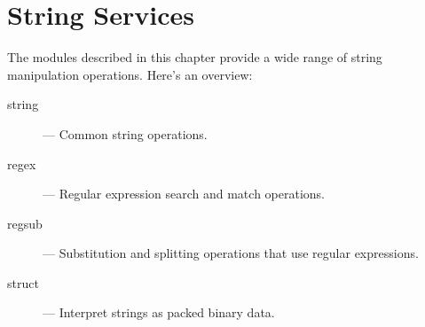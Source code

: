 \chapter{String Services}

The modules described in this chapter provide a wide range of string
manipulation operations.  Here's an overview:

\begin{description}

\item[string]
--- Common string operations.

\item[regex]
--- Regular expression search and match operations.

\item[regsub]
--- Substitution and splitting operations that use regular expressions.

\item[struct]
--- Interpret strings as packed binary data.

\end{description}
